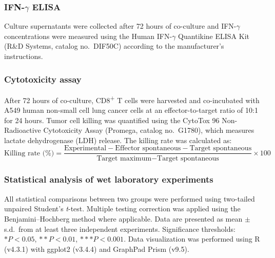 \subsubsection*{IFN-$\gamma$ ELISA}
Culture supernatants were collected after 72 hours of co-culture and IFN-$\gamma$ concentrations were measured using the Human IFN-$\gamma$ Quantikine ELISA Kit (R\&D Systems, catalog no.\ DIF50C) according to the manufacturer's instructions.

\subsubsection*{Cytotoxicity assay}
After 72 hours of co-culture, CD8\textsuperscript{+} T cells were harvested and co-incubated with A549 human non-small cell lung cancer cells at an effector-to-target ratio of 10:1 for 24 hours. Tumor cell killing was quantified using the CytoTox 96 Non-Radioactive Cytotoxicity Assay (Promega, catalog no.\ G1780), which measures lactate dehydrogenase (LDH) release. The killing rate was calculated as:
\begin{equation}
\text{Killing rate (\%)} = \frac{\text{Experimental} - \text{Effector spontaneous} - \text{Target spontaneous}}{\text{Target maximum} - \text{Target spontaneous}} \times 100
\end{equation}

\subsubsection*{Statistical analysis of wet laboratory experiments}
All statistical comparisons between two groups were performed using two-tailed unpaired Student's \textit{t}-test. Multiple testing correction was applied using the Benjamini--Hochberg method where applicable. Data are presented as mean $\pm$ s.d.\ from at least three independent experiments. Significance thresholds: $*P < 0.05$, $**P < 0.01$, $***P < 0.001$. Data visualization was performed using R (v4.3.1) with ggplot2 (v3.4.4) and GraphPad Prism (v9.5).
